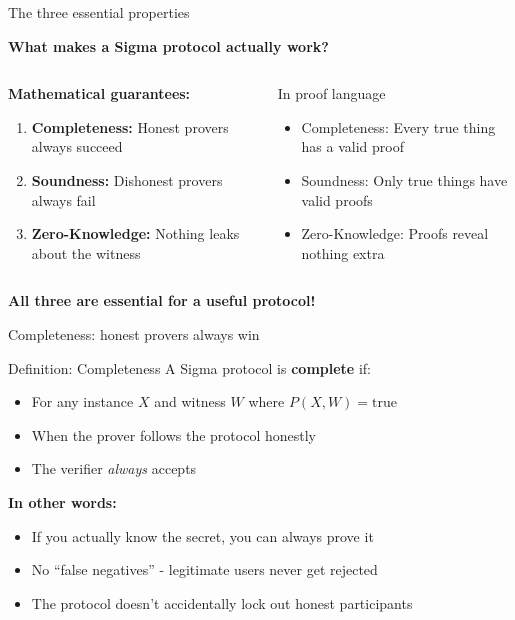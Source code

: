 \documentclass[aspectratio=169, lualatex, handout]{beamer}
\begin{document}
\begin{frame}{The three essential properties}
	\begin{center}
		\textbf{What makes a Sigma protocol actually work?}
	\end{center}
	\vspace{0.5em}
	\begin{columns}[c]
		\begin{column}{0.5\textwidth}
			\textbf{Mathematical guarantees:}
			\begin{enumerate}
				\item \textbf{Completeness:} Honest provers always succeed
				\item \textbf{Soundness:} Dishonest provers always fail
				\item \textbf{Zero-Knowledge:} Nothing leaks about the witness
			\end{enumerate}
		\end{column}
		\begin{column}{0.5\textwidth}
			\begin{alertblock}{In proof language}
				\begin{itemize}
					\item Completeness: Every true thing has a valid proof
					\item Soundness: Only true things have valid proofs
					\item Zero-Knowledge: Proofs reveal nothing extra
				\end{itemize}
			\end{alertblock}
		\end{column}
	\end{columns}
	\vspace{0.5em}
	\begin{center}
		\textbf{All three are essential for a useful protocol!}
	\end{center}
\end{frame}

\begin{frame}{Completeness: honest provers always win}
	\begin{block}{Definition: Completeness}
		A Sigma protocol is \textbf{complete} if:
		\begin{itemize}
			\item For any instance $X$ and witness $W$ where $P(X,W) = \text{true}$
			\item When the prover follows the protocol honestly
			\item The verifier \textit{always} accepts
		\end{itemize}
	\end{block}
	\vspace{0.5em}
	\textbf{In other words:}
	\begin{itemize}
		\item If you actually know the secret, you can always prove it
		\item No ``false negatives'' - legitimate users never get rejected
		\item The protocol doesn't accidentally lock out honest participants
	\end{itemize}
\end{frame}
\end{document}
